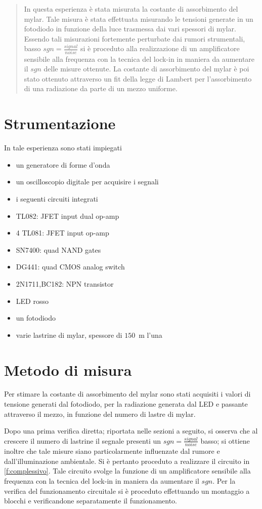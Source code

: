 \begin{abstract}
	In questa esperienza è stata misurata la costante di assorbimento del mylar.
	Tale misura è stata effettuata misurando le tensioni generate in un fotodiodo in funzione della luce trasmessa dai vari spessori di mylar.
	Essendo tali misurazioni fortemente perturbate dai rumori strumentali, basso $sgn=\frac{signal}{noise}$ 
	si è proceduto alla realizzazione di un amplificatore sensibile alla frequenza con la tecnica del lock-in
	in maniera da aumentare il $sgn$ delle misure ottenute.
	La costante di assorbimento del mylar è poi stato ottenuto attraverso un fit della 
	legge di Lambert per l'assorbimento di una radiazione da parte di un mezzo uniforme.
\end{abstract}

\section{Strumentazione}
	In tale esperienza sono stati impiegati 
	\begin{itemize}
		\item un generatore di forme d'onda
		\item un oscilloscopio digitale per acquisire i segnali
		\item i seguenti circuiti integrati 
			\item TL082: JFET input dual op-amp
			\item 4 TL081: JFET input op-amp
			\item SN7400: quad NAND gates
			\item DG441: quad CMOS analog switch
			\item 2N1711,BC182: NPN transistor
			\item LED rosso
			\item un fotodiodo
			\item varie lastrine di mylar, spessore di $150$\si{\mu \metre} l'una
	\end{itemize}
\section{Metodo di misura }
	Per stimare la costante di assorbimento del mylar sono stati acquisiti i valori di tensione generati 
	dal fotodiodo, per la radiazione generata dal LED e passante attraverso il mezzo,
	in funzione del numero di lastre di mylar.
	
	Dopo una prima verifica diretta; riportata nelle sezioni a seguito, si osserva che al crescere il
	numero di lastrine il segnale presenti un $sgn=\frac{signal}{noise}$ basso;
	si ottiene inoltre che tale misure siano particolarmente influenzate dal rumore e 
	dall'illuminazione ambientale.
	Si è pertanto proceduto a realizzare il circuito in \figurename{ \ref{f:complessivo}}.
	Tale circuito svolge la funzione di un amplificatore sensibile alla frequenza con la tecnica del lock-in in maniera da aumentare il $sgn$.
	Per la verifica del funzionamento circuitale si è proceduto effettuando un montaggio a blocchi
	e verificandone separatamente il funzionamento.
	
